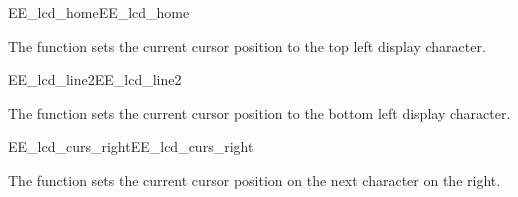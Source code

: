 \begin{function_nopb2}{EE\_lcd\_home}{EE_lcd_home}
  
  \begin{fundescription}
    The function sets the current cursor position to the top left
    display character.
  \end{fundescription}
  
  
  
\end{function_nopb2}

\begin{function_nopb2}{EE\_lcd\_line2}{EE_lcd_line2}
  
  \begin{fundescription}
    The function sets the current cursor position to the bottom left
    display character.
  \end{fundescription}
  
  
  
\end{function_nopb2}

\begin{function_nopb2}{EE\_lcd\_curs\_right}{EE_lcd_curs_right}
  
  \begin{fundescription}
    The function sets the current cursor position on the next
    character on the right.
  \end{fundescription}
  
  
  
\end{function_nopb2}

